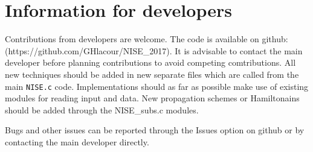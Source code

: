 \chapter{Information for developers\label{chap:developers}}
Contributions from developers are welcome. The code is available on
github:\\ (https://github.com/GHlacour/NISE\_2017). It is advisable to contact the main developer before planning contributions to avoid competing comtributions. All new techniques should be added in new separate files which are called from the main {\tt NISE.c} code. Implementations should as far as possible make use of existing modules for reading input and data. New propagation schemes or Hamiltonains should be added through the {NISE\_subs.c} modules.

Bugs and other issues can be reported through the Issues option on github or by contacting the main developer directly.
